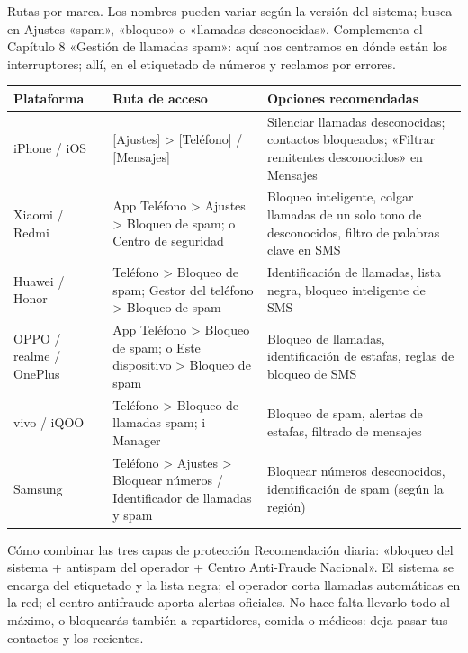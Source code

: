 
Rutas por marca. Los nombres pueden variar según la versión del sistema; busca en Ajustes «spam», «bloqueo» o «llamadas desconocidas». Complementa el Capítulo 8 «Gestión de llamadas spam»: aquí nos centramos en dónde están los interruptores; allí, en el etiquetado de números y reclamos por errores.

\begin{center}
\begin{tabularx}{\linewidth}{|X|X|X|}
\hline
\textbf{Plataforma} & \textbf{Ruta de acceso} & \textbf{Opciones recomendadas} \tabularnewline
\hline
iPhone / iOS & {}[Ajustes] > [Teléfono] / [Mensajes] & Silenciar llamadas desconocidas; contactos bloqueados; «Filtrar remitentes desconocidos» en Mensajes \tabularnewline
Xiaomi / Redmi & App Teléfono > Ajustes > Bloqueo de spam; o Centro de seguridad & Bloqueo inteligente, colgar llamadas de un solo tono de desconocidos, filtro de palabras clave en SMS \tabularnewline
Huawei / Honor & Teléfono > Bloqueo de spam; Gestor del teléfono > Bloqueo de spam & Identificación de llamadas, lista negra, bloqueo inteligente de SMS \tabularnewline
OPPO / realme / OnePlus & App Teléfono > Bloqueo de spam; o Este dispositivo > Bloqueo de spam & Bloqueo de llamadas, identificación de estafas, reglas de bloqueo de SMS \tabularnewline
vivo / iQOO & Teléfono > Bloqueo de llamadas spam; i Manager & Bloqueo de spam, alertas de estafas, filtrado de mensajes \tabularnewline
Samsung & Teléfono > Ajustes > Bloquear números / Identificador de llamadas y spam & Bloquear números desconocidos, identificación de spam (según la región) \tabularnewline
\hline
\end{tabularx}
\end{center}

\begin{tcbinfo}{Cómo combinar las tres capas de protección}
Recomendación diaria: «bloqueo del sistema + antispam del operador + Centro Anti-Fraude Nacional». El sistema se encarga del etiquetado y la lista negra; el operador corta llamadas automáticas en la red; el centro antifraude aporta alertas oficiales. No hace falta llevarlo todo al máximo, o bloquearás también a repartidores, comida o médicos: deja pasar tus contactos y los recientes.

\end{tcbinfo}

